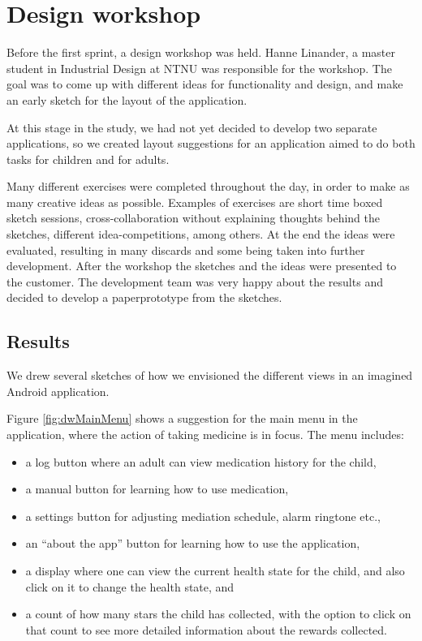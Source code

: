 \section{Design workshop}
\label{sec:designWorkshop}
Before the first sprint, a design workshop was held. Hanne Linander, a
master student in Industrial Design at NTNU was responsible for the workshop.
The goal was to come up with different ideas for functionality and design, and
make an early sketch for the layout of the application.

At this stage in the study, we had not yet decided to develop two separate
applications, so we created layout suggestions for an application aimed to do
both tasks for children and for adults.

Many different exercises were completed throughout the day, in order to make as many
creative ideas as possible. Examples of exercises are short time boxed sketch
sessions, cross-collaboration without explaining thoughts behind the sketches,
different idea-competitions, among others. At the end the ideas were evaluated,
resulting in many discards and some being taken into further development.
After the workshop the sketches and the ideas were presented to the customer.
The development team was very happy about the results and decided to develop a
paperprototype from the sketches.

\subsection{Results}
We drew several sketches of how we envisioned the different views in an 
imagined Android application. 

Figure \ref{fig:dwMainMenu} shows a suggestion for the main menu in the 
application, where the action of taking medicine is in focus. The menu includes:
\begin{itemize}
  \item a log button where an adult can view medication history for the child,
  \item a manual button for learning how to use medication,
  \item a settings button for adjusting mediation schedule, alarm ringtone etc.,
  \item an ``about the app'' button for learning how to use the application,
  \item a display where one can view the current health state for the child, and
  		also click on it to change the health state, and
  \item a count of how many stars the child has collected, with the option to
  		click on that count to see more detailed information about the rewards
  		collected.
\end{itemize}

